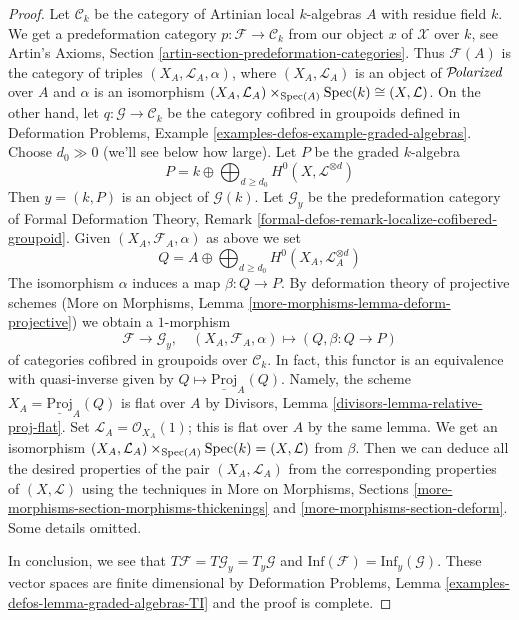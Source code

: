 \begin{proof}
\medskip\noindent
Let $\mathcal{C}_k$ be the category of Artinian local $k$-algebras
$A$ with residue field $k$. We get a predeformation category
$p : \mathcal{F} \to \mathcal{C}_k$ from our object $x$ of $\mathcal{X}$
over $k$, see
Artin's Axioms, Section \ref{artin-section-predeformation-categories}.
Thus $\mathcal{F}(A)$ is the category of triples
$(X_A, \mathcal{L}_A, \alpha)$, where $(X_A, \mathcal{L}_A)$
is an object of $\mathcal{P}\!\mathit{olarized}$ over $A$ and $\alpha$ is an isomorphism
$(X_A, \mathcal{L}_A) \times_{\mathop{\mathrm{Spec}}(A)} \mathop{\mathrm{Spec}}(k) \cong (X, \mathcal{L})$.
On the other hand, let $q : \mathcal{G} \to \mathcal{C}_k$
be the category cofibred in groupoids defined in
Deformation Problems, Example \ref{examples-defos-example-graded-algebras}.
Choose $d_0 \gg 0$ (we'll see below how large).
Let $P$ be the graded $k$-algebra
$$
P = k \oplus \bigoplus\nolimits_{d \geq d_0} H^0(X, \mathcal{L}^{\otimes d})
$$
Then $y = (k, P)$ is an object of $\mathcal{G}(k)$.
Let $\mathcal{G}_y$ be the predeformation category of
Formal Deformation Theory, Remark
\ref{formal-defos-remark-localize-cofibered-groupoid}.
Given $(X_A, \mathcal{F}_A, \alpha)$ as above we set
$$
Q = A \oplus \bigoplus\nolimits_{d \geq d_0} H^0(X_A, \mathcal{L}_A^{\otimes d})
$$
The isomorphism $\alpha$ induces a map $\beta : Q \to P$.
By deformation theory of projective schemes
(More on Morphisms, Lemma \ref{more-morphisms-lemma-deform-projective})
we obtain a $1$-morphism
$$
\mathcal{F} \longrightarrow \mathcal{G}_y,\quad
(X_A, \mathcal{F}_A, \alpha) \longmapsto (Q, \beta : Q \to P)
$$
of categories cofibred in groupoids over $\mathcal{C}_k$.
In fact, this functor is an equivalence with quasi-inverse
given by $Q \mapsto \underline{\text{Proj}}_A(Q)$.
Namely, the scheme $X_A = \underline{\text{Proj}}_A(Q)$
is flat over $A$ by Divisors, Lemma \ref{divisors-lemma-relative-proj-flat}.
Set $\mathcal{L}_A = \mathcal{O}_{X_A}(1)$; this is flat over $A$
by the same lemma. We get an isomorphism
$(X_A, \mathcal{L}_A) \times_{\mathop{\mathrm{Spec}}(A)} \mathop{\mathrm{Spec}}(k) = (X, \mathcal{L})$
from $\beta$. Then we can deduce all the desired properties of
the pair $(X_A, \mathcal{L}_A)$ from the corresponding properties
of $(X, \mathcal{L})$ using the techniques in
More on Morphisms, Sections
\ref{more-morphisms-section-morphisms-thickenings} and
\ref{more-morphisms-section-deform}.
Some details omitted.

\medskip\noindent
In conclusion, we see that $T\mathcal{F} = T\mathcal{G}_y = T_y\mathcal{G}$
and $\text{Inf}(\mathcal{F}) = \text{Inf}_y(\mathcal{G})$.
These vector spaces are finite dimensional by Deformation Problems, Lemma
\ref{examples-defos-lemma-graded-algebras-TI}
and the proof is complete.
\end{proof}

